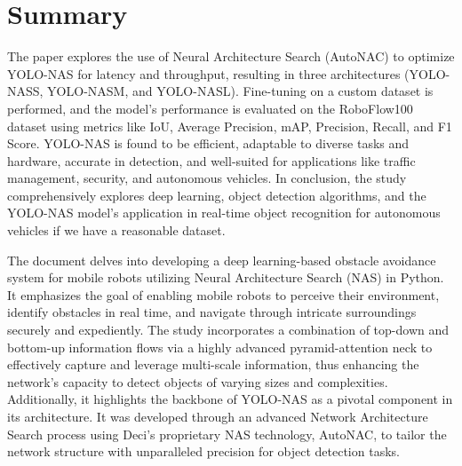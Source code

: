\section{Summary}
The paper explores the use of Neural Architecture Search (AutoNAC) to optimize YOLO-NAS for latency and throughput, resulting in three architectures (YOLO-NASS, YOLO-NASM, and YOLO-NASL). Fine-tuning on a custom dataset is performed, and the model's performance is evaluated on the RoboFlow100 dataset using metrics like IoU, Average Precision, mAP, Precision, Recall, and F1 Score. YOLO-NAS is found to be efficient, adaptable to diverse tasks and hardware, accurate in detection, and well-suited for applications like traffic management, security, and autonomous vehicles.
In conclusion, the study comprehensively explores deep learning, object detection algorithms, and the YOLO-NAS model's application in real-time object recognition for autonomous vehicles if we have a reasonable dataset.


The document delves into developing a deep learning-based obstacle avoidance system for mobile robots utilizing Neural Architecture Search (NAS) in Python. It emphasizes the goal of enabling mobile robots to perceive their environment, identify obstacles in real time, and navigate through intricate surroundings securely and expediently. The study incorporates a combination of top-down and bottom-up information flows via a highly advanced pyramid-attention neck to effectively capture and leverage multi-scale information, thus enhancing the network's capacity to detect objects of varying sizes and complexities. Additionally, it highlights the backbone of YOLO-NAS as a pivotal component in its architecture. It was developed through an advanced Network Architecture Search process using Deci's proprietary NAS technology, AutoNAC, to tailor the network structure with unparalleled precision for object detection tasks. 